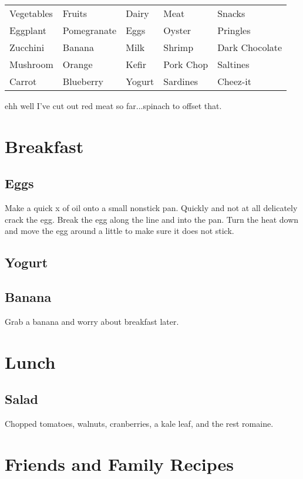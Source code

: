 \documentclass{article}
\begin{document}
\begin{table}
\begin{tabular}{lllll}
Vegetables & Fruits & Dairy & Meat & Snacks \\
Eggplant   & Pomegranate & Eggs & Oyster & Pringles \\
Zucchini   & Banana  & Milk & Shrimp & Dark Chocolate \\
Mushroom   & Orange & Kefir & Pork Chop & Saltines \\ 
Carrot    & Blueberry & Yogurt & Sardines & Cheez-it \\

\end{tabular}
\end{table}

ehh well I've cut out red meat so far...spinach to offset that. 


\section*{Breakfast}

\subsection*{Eggs}
Make a quick x of oil onto a small nonstick pan. Quickly and not at all delicately crack the egg. Break the egg along the line and into the pan. Turn the heat down and move the egg around a little to make sure it does not stick.   

\subsection*{Yogurt}

\subsection*{Banana}
Grab a banana and worry about breakfast later.

\section*{Lunch}

\subsection*{Salad}
Chopped tomatoes, walnuts, cranberries, a kale leaf, and the rest romaine. 
\section*{Friends and Family Recipes}
\end{document}
